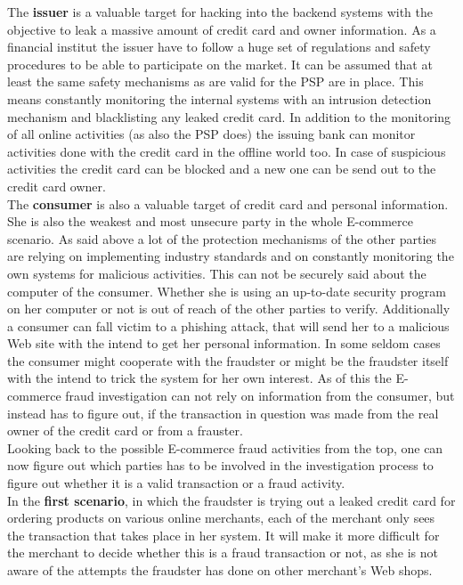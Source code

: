 The \textbf{issuer} is a valuable target for hacking into the backend systems with the objective to leak a massive amount of credit card and owner information. As a financial institut the issuer have to follow a huge set of regulations and safety procedures to be able to participate on the market. It can be assumed that at least the same safety mechanisms as are valid for the \gls{PSP} are in place. This means constantly monitoring the internal systems with an intrusion detection mechanism and blacklisting any leaked credit card. In addition to the monitoring of all online activities (as also the \gls{PSP} does) the issuing bank can monitor activities done with the credit card in the offline world too. In case of suspicious activities the credit card can be blocked and a new one can be send out to the credit card owner. \\

The \textbf{consumer} is also a valuable target of credit card and personal information. She is also the weakest and most unsecure party in the whole E-commerce scenario. As said above a lot of the protection mechanisms of the other parties are relying on implementing industry standards and on constantly monitoring the own systems for malicious activities. This can not be securely said about the computer of the consumer. Whether she is using an up-to-date security program on her computer or not is out of reach of the other parties to verify. Additionally a consumer can fall victim to a phishing attack, that will send her to a malicious Web site with the intend to get her personal information. In some seldom cases the consumer might cooperate with the fraudster or might be the fraudster itself with the intend to trick the system for her own interest. As of this the E-commerce fraud investigation can not rely on information from the consumer, but instead has to figure out, if the transaction in question was made from the real owner of the credit card or from a frauster. \\

Looking back to the possible E-commerce fraud activities from the top, one can now figure out which parties has to be involved in the investigation process to figure out whether it is a valid transaction or a fraud activity. \\

In the \textbf{first scenario}, in which the fraudster is trying out a leaked credit card for ordering products on various online merchants, each of the merchant only sees the transaction that takes place in her system. It will make it more difficult for the merchant to decide whether this is a fraud transaction or not, as she is not aware of the attempts the fraudster has done on other merchant's Web shops. \\

